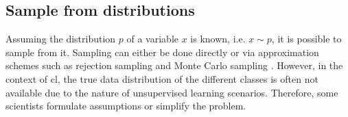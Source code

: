
\subsection{Sample from distributions}
\label{subsec:SampleViaDistribution}

Assuming the distribution $p$ of a variable $x$ is known, i.e. $x \sim p$, it is possible to sample from it.
Sampling can either be done directly or 
via approximation schemes such as rejection sampling and Monte Carlo sampling \citet{robinson_contrastive_2021}.
However, in the context of \ac{cl}, the true data distribution of the different classes is often not available 
due to the nature of unsupervised learning scenarios.
Therefore, some scientists formulate assumptions or simplify the problem.









